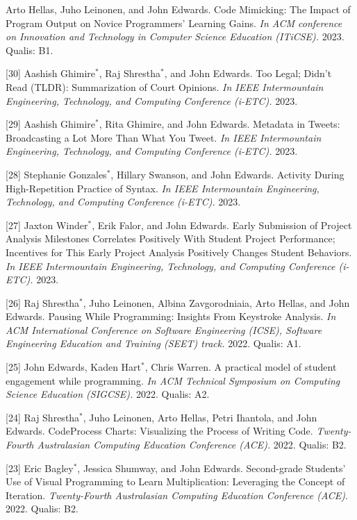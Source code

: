 \documentclass[margin,line]{res}
\newcommand{\cnum}[1]{[#1]}
\begin{document}
\begin{resume}
\cnum{31} Arto Hellas, Juho Leinonen, and John Edwards. Code Mimicking: The Impact of Program Output on Novice Programmers’ Learning Gains. \textit{In ACM conference on Innovation and Technology in Computer Science Education (ITiCSE).} 2023. Qualis: B1.

\cnum{30} Aashish Ghimire$^*$, Raj Shrestha$^*$, and John Edwards. Too Legal; Didn’t Read (TLDR): Summarization of Court Opinions. \textit{In IEEE Intermountain Engineering, Technology, and Computing Conference (i-ETC).} 2023.

\cnum{29} Aashish Ghimire$^*$, Rita Ghimire, and John Edwards. Metadata in Tweets: Broadcasting a Lot More Than What You Tweet. \textit{In IEEE Intermountain Engineering, Technology, and Computing Conference (i-ETC).} 2023.

\cnum{28} Stephanie Gonzales$^*$, Hillary Swanson, and John Edwards. Activity During High-Repetition Practice of Syntax. \textit{In IEEE Intermountain Engineering, Technology, and Computing Conference (i-ETC).} 2023.

\cnum{27} Jaxton Winder$^*$, Erik Falor, and John Edwards. Early Submission of Project Analysis Milestones Correlates Positively With Student Project Performance; Incentives for This Early Project Analysis Positively Changes Student Behaviors. \textit{In IEEE Intermountain Engineering, Technology, and Computing Conference (i-ETC).} 2023.

\cnum{26} Raj Shrestha$^*$, Juho Leinonen, Albina Zavgorodniaia, Arto Hellas, and John Edwards. Pausing While Programming: Insights From Keystroke Analysis. \textit{In ACM International Conference on Software Engineering (ICSE), Software Engineering Education and Training (SEET) track.} 2022. Qualis: A1.

\cnum{25} John Edwards, Kaden Hart$^*$, Chris Warren. A practical model of student engagement while programming. \textit{In ACM Technical Symposium on Computing Science Education (SIGCSE).} 2022. Qualis: A2.

\cnum{24} Raj Shrestha$^*$, Juho Leinonen, Arto Hellas, Petri Ihantola, and John Edwards. CodeProcess Charts: Visualizing the Process of Writing Code. \textit{Twenty-Fourth Australasian Computing Education Conference (ACE).} 2022. Qualis: B2.

\cnum{23} Eric Bagley$^*$, Jessica Shumway, and John Edwards. Second-grade Students' Use of Visual Programming to Learn Multiplication: Leveraging the Concept of Iteration. \textit{Twenty-Fourth Australasian Computing Education Conference (ACE).} 2022. Qualis: B2.


\end{resume}
\end{document}

